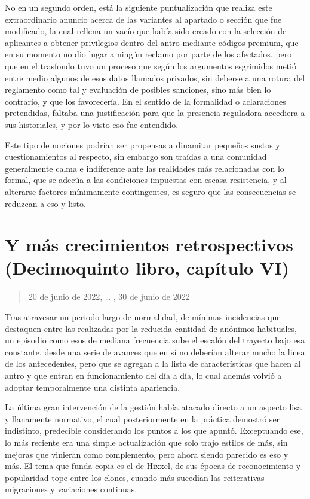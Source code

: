 \documentclass[
]{book}
\begin{document}
No en un segundo orden, está la siguiente puntualización que realiza este extraordinario anuncio acerca de las variantes al apartado o sección que fue modificado, la cual rellena un vacío que había sido creado con la selección de aplicantes a obtener privilegios dentro del antro mediante códigos premium, que en su momento no dio lugar a ningún reclamo por parte de los afectados, pero que en el trasfondo tuvo un proceso que según los argumentos esgrimidos metió entre medio algunos de esos datos llamados privados, sin deberse a una rotura del reglamento como tal y evaluación de posibles sanciones, sino más bien lo contrario, y que los favorecería. En el sentido de la formalidad o aclaraciones pretendidas, faltaba una justificación para que la presencia reguladora accediera a sus historiales, y por lo visto eso fue entendido.

Este tipo de nociones podrían ser propensas a dinamitar pequeños sustos y cuestionamientos al respecto, sin embargo son traídas a una comunidad generalmente calma e indiferente ante las realidades más relacionadas con lo formal, que se adecúa a las condiciones impuestas con escasa resistencia, y al alterarse factores mínimamente contingentes, es seguro que las consecuencias se reduzcan a eso y listo.

\hypertarget{y-muxe1s-crecimientos-retrospectivos-decimoquinto-libro-capuxedtulo-vi}{%
\section{Y más crecimientos retrospectivos (Decimoquinto libro, capítulo VI)}\label{y-muxe1s-crecimientos-retrospectivos-decimoquinto-libro-capuxedtulo-vi}}

\begin{quote}
20 de junio de 2022, \ldots{} , 30 de junio de 2022
\end{quote}

Tras atravesar un periodo largo de normalidad, de mínimas incidencias que destaquen entre las realizadas por la reducida cantidad de anónimos habituales, un episodio como esos de mediana frecuencia sube el escalón del trayecto bajo esa constante, desde una serie de avances que en sí no deberían alterar mucho la linea de los antecedentes, pero que se agregan a la lista de características que hacen al antro y que entran en funcionamiento del día a día, lo cual además volvió a adoptar temporalmente una distinta apariencia.

La última gran intervención de la gestión había atacado directo a un aspecto lisa y llanamente normativo, el cual posteriormente en la práctica demostró ser indistinto, predecible considerando los puntos a los que apuntó. Exceptuando ese, lo más reciente era una simple actualización que solo trajo estilos de más, sin mejoras que vinieran como complemento, pero ahora siendo parecido es eso y más. El tema que funda copia es el de Hixxel, de sus épocas de reconocimiento y popularidad tope entre los clones, cuando más sucedían las reiterativas migraciones y variaciones continuas.
\end{document}
